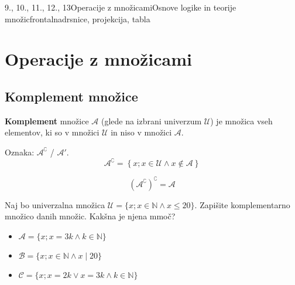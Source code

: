 \begin{priprava}{9., 10., 11., 12., 13}{}{Operacije z množicami}{Osnove logike in teorije množic}{frontalna}{drsnice, projekcija, tabla}


    \section{Operacije z množicami}

    \subsection{Komplement množice}
    
                \textbf{Komplement} množice $\mathcal{A}$ (glede na izbrani univerzum $\mathcal{U}$) je množica 
                vseh elementov, ki so v množici $\mathcal{U}$ in niso v množici $\mathcal{A}$.

                Oznaka: $\mathbf{\mathcal{A}^\complement}$ / $\mathbf{\mathcal{A}'}$.      
                $$ \mathcal{A}^\complement=\left\{ x; x\in\mathcal{U}\land x\notin\mathcal{A}\right\} $$           
            

            \begin{figure}[H]
                \centering
            \end{figure}

        $$\left( \mathcal{A}^\complement\right)^\complement=\mathcal{A} $$
        
        \begin{naloga}
            Naj bo univerzalna množica $\mathcal{U}=\{x; x\in\mathbb{N} \land x\leq 20\}$. 
            Zapišite komplementarno množico danih množic. Kakšna je njena mmoč?
            \begin{itemize}
                \item $\mathcal{A}=\{x; x=3k \land k\in\mathbb{N}\}$
                \item $\mathcal{B}=\{x; x\in\mathbb{N} \land x\mid 20\}$
                \item $\mathcal{C}=\{x; x=2k \lor x=3k \land k\in\mathbb{N}\}$
            \end{itemize}
        \end{naloga}




\end{priprava}
